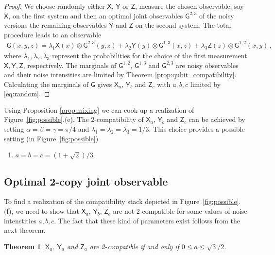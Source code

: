 \documentclass[12pt]{amsart}
\newtheorem{theorem}{Theorem}
\theoremstyle{definition}
\newcommand{\G}{\mathsf{G}}%
\newcommand{\X}{\mathsf{X}}%
\newcommand{\Y}{\mathsf{Y}}%
\newcommand{\Z}{\mathsf{Z}}%
\begin{document}
\begin{proof}
We choose randomly either $\X$, $\Y$ or $\Z$, measure the chosen observable, say $\X$, on the first system and then an optimal joint observables $\G^{2,3}$ of the noisy versions the remaining observables $\Y$ and $\Z$ on the second system. 
The total procedure leads to an observable
\begin{align*}
\G(x,y,z) = \lambda_1 \X(x) \otimes \G^{2,3}(y,z) + \lambda_2 \Y(y) \otimes \G^{1,3}(x,z) + \lambda_3 \Z(z) \otimes \G^{1,2}(x,y) \, ,
\end{align*}
where $\lambda_1,\lambda_2, \lambda_3$ represent the probabilities for the choice of the first measurement $\X,\Y,\Z$, respectively.
The marginals of $\G^{1,2}$, $\G^{1,3}$ and $\G^{2,3}$ are noisy observables and their noise intensities are limited by Theorem \ref{prop:qubit_compatibility}.
Calculating the marginals of $\G$ gives $\X_a$, $\Y_b$ and $\Z_c$ with $a,b,c$ limited by \eqref{eq:random}.
\end{proof}

Using Proposition \ref{prop:mixing} we can cook up a realization of Figure~\ref{fig:possible}.(e).
The $2$-compatibility of $\X_a$, $\Y_b$ and $\Z_c$ can be achieved by setting
 $\alpha=\beta=\gamma=\pi/4$ and $\lambda_1=\lambda_2=\lambda_3=1/3$.
This choice provides a possible setting (in Figure~\ref{fig:possible})
\begin{enumerate}[leftmargin=*,labelsep=3mm,label=(\alph*),start=5]
\item $a=b=c=(1+\sqrt{2})/3$.
\end{enumerate}


\subsection{Optimal 2-copy joint observable}\label{app:proof_teo:2comp}

To find a realization of the compatibility stack depicted in Figure~\ref{fig:possible}.(f), we need to show that $\X_a$, $\Y_b$, $\Z_c$ are not $2$-compatible for some values of noise intenstities $a,b,c$. 
The fact that these kind of parameters exist follows from the next theorem.

\begin{theorem}\label{teo:2comp}
$\X_a$, $\Y_a$ and $\Z_a$ are 2-compatible if and only if $0\leq a\leq \sqrt{3}/2$.
\end{theorem}
\end{document}
